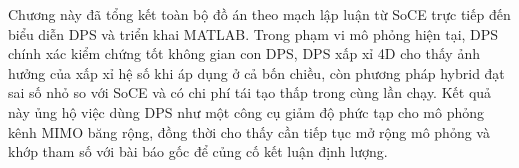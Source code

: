 Chương này đã tổng kết toàn bộ đồ án theo mạch lập luận từ SoCE trực tiếp đến biểu diễn DPS và triển khai MATLAB. Trong phạm vi mô phỏng hiện tại, DPS chính xác kiểm chứng tốt không gian con DPS, DPS xấp xỉ 4D cho thấy ảnh hưởng của xấp xỉ hệ số khi áp dụng ở cả bốn chiều, còn phương pháp hybrid đạt sai số nhỏ so với SoCE và có chi phí tái tạo thấp trong cùng lần chạy. Kết quả này ủng hộ việc dùng DPS như một công cụ giảm độ phức tạp cho mô phỏng kênh MIMO băng rộng, đồng thời cho thấy cần tiếp tục mở rộng mô phỏng và khớp tham số với bài báo gốc để củng cố kết luận định lượng.

\cleardoublepage
